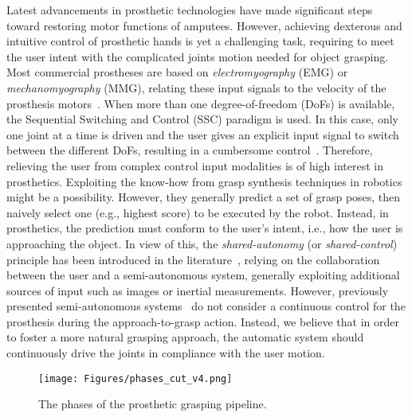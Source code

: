     Latest advancements in prosthetic technologies have made significant steps toward restoring motor functions of amputees. However, achieving dexterous and intuitive control of prosthetic hands is yet a challenging task, requiring to meet the user intent with the complicated joints motion needed for object grasping. Most commercial prostheses are based on \textit{electromyography} (EMG) or \textit{mechanomyography} (MMG), relating these input signals to the velocity of the prosthesis motors~\cite{chen2023}. When more than one degree-of-freedom (DoFs) is available, the Sequential Switching and Control (SSC) paradigm is used. In this case, only one joint at a time is driven and the user gives an explicit input signal to switch between the different DoFs, resulting in a cumbersome control~\cite{amsuess2014}. Therefore, relieving the user from complex control input modalities is of high interest in prosthetics. 
Exploiting the know-how from grasp synthesis techniques in robotics~\cite{newbury2023deep} might be a possibility. However, they generally predict a set of grasp poses, then naively select one (e.g., highest score) to be executed by the robot. Instead, in prosthetics, the prediction must conform to the user's intent, i.e., how the user is approaching the object.
In view of this, the \textit{shared-autonomy} (or \textit{shared-control}) principle has been introduced in the literature~\cite{gardner2020}, relying on the collaboration between the user and a semi-autonomous system, generally exploiting additional sources of input such as images or inertial measurements. However, previously presented semi-autonomous systems~\cite{vasile2022,starke2022} do not consider a continuous control for the prosthesis during the approach-to-grasp action. Instead, we believe that in order to foster a more natural grasping approach, the automatic system should continuously drive the joints in compliance with the user motion.

\begin{figure}
    \vspace{+0.3cm}
    \centering
    \texttt{[image: Figures/phases\_cut\_v4.png]}
    \caption{The phases of the prosthetic grasping pipeline.}
    \label{fig:phases}
    \vspace{-0.6cm}
\end{figure}

